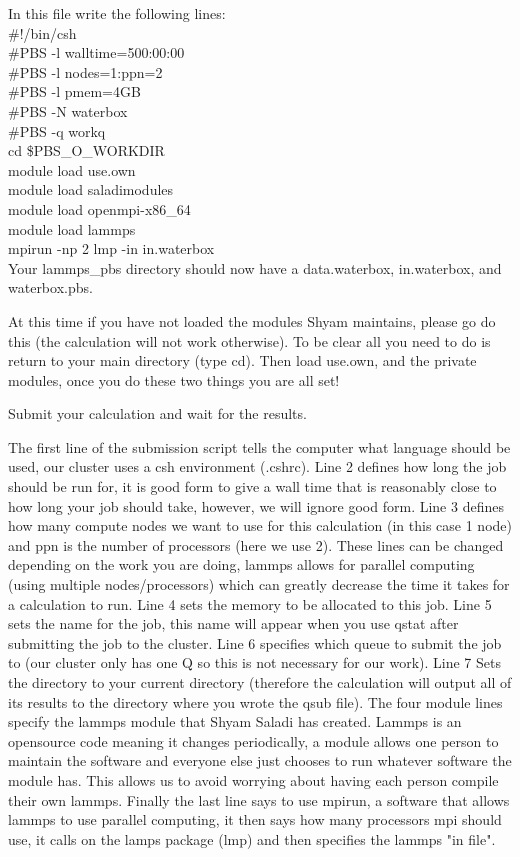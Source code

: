 \documentclass{article}
\begin{document}
\begin{enumerate}
In this file write the following lines:\\
\#!/bin/csh\\
 \#PBS -l walltime=500:00:00\\
 \#PBS -l nodes=1:ppn=2\\
 \#PBS -l pmem=4GB\\
 \#PBS -N waterbox\\
 \#PBS -q workq\\
 cd \$PBS\_O\_WORKDIR\\
 module load use.own\\
 module load saladimodules\\
 module load openmpi-x86\_64\\
 module load lammps\\
 mpirun -np 2 lmp -in in.waterbox\\

 Your lammps\_pbs directory should now  have a data.waterbox, in.waterbox, and waterbox.pbs.

 At this time if you have not loaded the modules Shyam maintains, please go do this (the calculation will not work otherwise). 
 To be clear all you need to do is return to your main directory (type cd).
 Then load use.own, and the private modules, once you do these two things you are all set!
 
 Submit your calculation and wait for the results.

The first line of the submission script tells the computer what language should be used, our cluster uses a csh environment (.cshrc).
Line 2 defines how long the job should be run for, it is good form to give a wall time that is reasonably close to how long your job should take, however, we will ignore good form.
Line 3 defines how many compute nodes we want to use for this calculation (in this case 1 node) and ppn is the number of processors (here we use 2). 
These lines can be changed depending on the work you are doing, lammps allows for parallel computing (using multiple nodes/processors) which can greatly decrease the time it takes for a calculation to run. 
Line 4 sets the memory to be allocated to this job.
Line 5 sets the name for the job, this name will appear when you use qstat after submitting the job to the cluster. 
Line 6 specifies which queue to submit the job to (our cluster only has one Q so this is not necessary for our work).
Line 7 Sets the directory to your current directory (therefore the calculation will output all of its results to the directory where you wrote the qsub file). 
The four module lines specify the lammps module that Shyam Saladi has created. 
Lammps is an opensource code meaning it changes periodically, a module allows one person to maintain the software and everyone else just chooses to run whatever software the module has.
This allows us to avoid worrying about having each person compile their own lammps. 
Finally the last line says to use mpirun, a software that allows lammps to use parallel computing, it then says how many processors mpi should use, it calls on the lamps package (lmp) and then specifies the lammps "in file". 
\end{enumerate}
\end{document}
